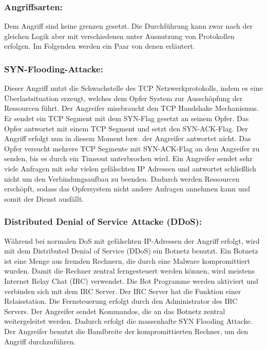 \subsubsection{Angriffsarten:}
Dem Angriff sind keine grenzen gesetzt. Die Durchführung kann zwar nach der gleichen Logik aber mit verschiedenen unter Ausnutzung von Protokollen erfolgen. Im Folgenden werden ein Paar von denen erläutert.\par

\subsubsection{SYN-Flooding-Attacke:}
Dieser Angriff nutzt die Schwachstelle des TCP Netzwerkprotokolls, indem es eine Überlastsituation erzeugt, welches dem Opfer System zur Ausschöpfung der Ressourcen führt. Der Angreifer missbraucht den TCP Handshake Mechanismus. Er sendet ein TCP Segment mit dem SYN-Flag gesetzt an seinem Opfer. Das Opfer antwortet mit einem TCP Segment und setzt den SYN-ACK-Flag. Der Angriff erfolgt nun in diesem Moment bzw. der Angreifer antwortet nicht. Das Opfer versucht mehrere TCP Segmente mit SYN-ACK-Flag an dem Angreifer zu senden, bis es durch ein Timeout unterbrochen wird. Ein Angreifer sendet sehr viele Anfragen mit sehr vielen gefälschten IP Adressen und antwortet schließlich nicht um den Verbindungsaufbau zu beenden. Dadurch werden Ressourcen erschöpft, sodass das Opfersystem nicht andere Anfragen annehmen kann und somit der Dienst ausfällt.\cite{ref_book_attack_3}\par

\subsubsection{Distributed Denial of Service Attacke (DDoS):}
Während bei normalen DoS mit gefälschten IP-Adressen der Angriff erfolgt, wird mit dem Distributed Denial of Service (DDoS) ein Botnetz benutzt. Ein Botnetz ist eine Menge aus fremden Rechnern, die durch eine Malware kompromittiert wurden. Damit die Rechner zentral ferngesteuert werden können, wird meistens Internet Relay Chat (IRC) verwendet. Die Bot Programme werden aktiviert und verbinden sich mit dem IRC Server. Der IRC Server hat die Funktion einer Relaisstation. Die Fernsteuerung erfolgt durch den Administrator des IRC Servers. Der Angreifer sendet Kommandos, die an das Botnetz zentral weitergeleitet werden. Dadurch erfolgt die massenhafte SYN Flooding Attacke. Der Angreifer benutzt die Bandbreite der kompromittierten Rechner, um den Angriff durchzuführen.\cite{ref_book_attack_7}\par